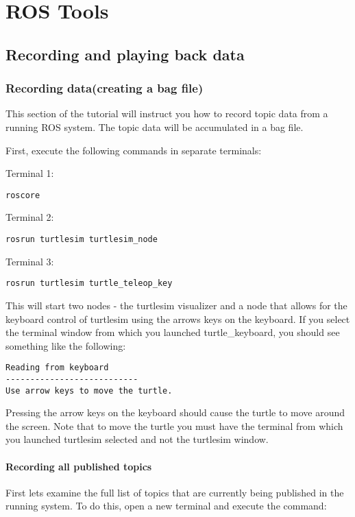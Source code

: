 \chapter{ROS Tools}

\section{Recording and playing back data}

\subsection{Recording data(creating a bag file)}

This section of the tutorial will instruct you how to record topic data from a running ROS system. The topic data will be accumulated in a bag file.

First, execute the following commands in separate terminals:

Terminal 1:
\begin{lstlisting}[breaklines=true languages=bash]
roscore
\end{lstlisting}

Terminal 2:
\begin{lstlisting}[breaklines=true languages=bash]
rosrun turtlesim turtlesim_node
\end{lstlisting}

Terminal 3:
\begin{lstlisting}[breaklines=true languages=bash]
rosrun turtlesim turtle_teleop_key
\end{lstlisting}

This will start two nodes - the turtlesim visualizer and a node that allows for the keyboard control of turtlesim using the arrows keys on the keyboard. If you select the terminal window from which you launched turtle\_keyboard, you should see something like the following:

\begin{lstlisting}[breaklines=true languages=bash]
Reading from keyboard
---------------------------
Use arrow keys to move the turtle.
\end{lstlisting}

Pressing the arrow keys on the keyboard should cause the turtle to move around the screen. Note that to move the turtle you must have the terminal from which you launched turtlesim selected and not the turtlesim window.

\subsubsection{Recording all published topics}
First lets examine the full list of topics that are currently being published in the running system. To do this, open a new terminal and execute the command:

